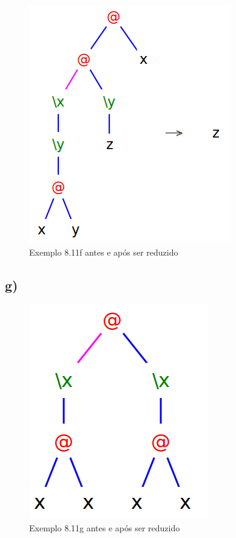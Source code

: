 \documentclass[a4paper]{article}
\begin{document}
\begin{figure}[h]
  \centering
  \includegraphics[scale=0.5]{8-11f.png}
  \caption{Exemplo 8.11f antes e após ser reduzido}
\end{figure}

\FloatBarrier

\subsection*{g)}

\begin{figure}[h]
  \centering
  \includegraphics[scale=0.4]{8-11g.png}
  \caption{Exemplo 8.11g antes e após ser reduzido}
\end{figure}
\end{document}
